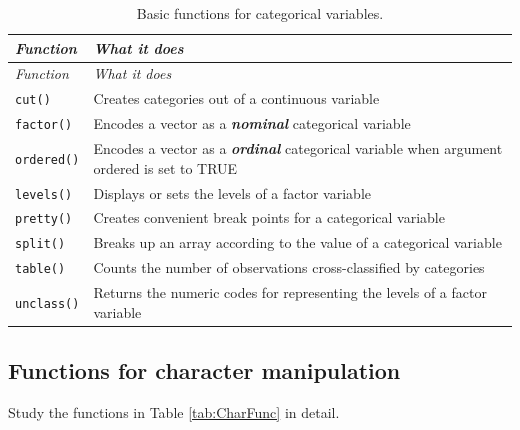 \documentclass[
]{book}
\begin{document}
\begin{longtable}[]{@{}
  >{\raggedright\arraybackslash}p{}
  >{\raggedright\arraybackslash}p{}@{}}
\caption{\label{tab:CatFunc} Basic functions for categorical variables.}\tabularnewline
\toprule\noalign{}
\begin{minipage}[b]{\linewidth}\raggedright
\emph{{Function}}
\end{minipage} & \begin{minipage}[b]{\linewidth}\raggedright
\emph{{What it does}}
\end{minipage} \\
\midrule\noalign{}
\endfirsthead
\toprule\noalign{}
\begin{minipage}[b]{\linewidth}\raggedright
\emph{{Function}}
\end{minipage} & \begin{minipage}[b]{\linewidth}\raggedright
\emph{{What it does}}
\end{minipage} \\
\midrule\noalign{}
\endhead
\bottomrule\noalign{}
\endlastfoot
\texttt{cut()} & Creates categories out of a continuous variable \\
\texttt{factor()} & Encodes a vector as a \textbf{\emph{nominal}} categorical variable \\
\texttt{ordered()} & Encodes a vector as a \textbf{\emph{ordinal}} categorical variable when argument ordered is set to TRUE \\
\texttt{levels()} & Displays or sets the levels of a factor variable \\
\texttt{pretty()} & Creates convenient break points for a categorical variable \\
\texttt{split()} & Breaks up an array according to the value of a categorical variable \\
\texttt{table()} & Counts the number of observations cross-classified by categories \\
\texttt{unclass()} & Returns the numeric codes for representing the levels of a factor variable \\
\end{longtable}

\subsection{Functions for character manipulation}\label{character}

Study the functions in Table \ref{tab:CharFunc} in detail.
\end{document}
